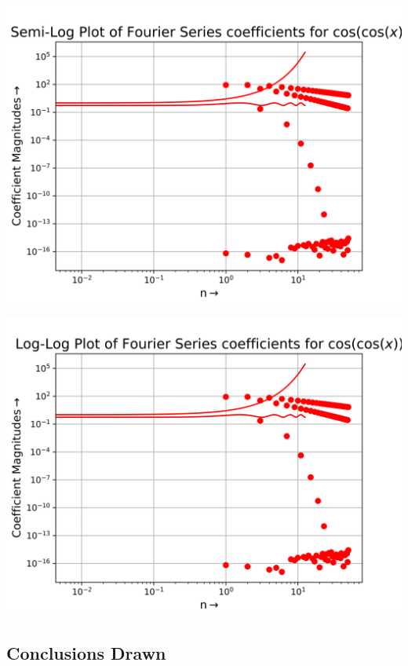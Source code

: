 \documentclass[12pt]{article}
\begin{document}
\begin{center}
    \includegraphics[scale=0.8]{images/Figure5.png}
\end{center}
\begin{center}
    \includegraphics[scale=0.8]{images/Figure6.png}
\end{center}

\subsection{Conclusions Drawn}
\end{document}
